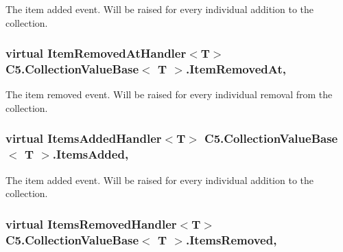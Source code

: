 The item added event. Will be raised for every individual addition to the collection. 

\hypertarget{class_c5_1_1_collection_value_base_a9cd4d9d9e588e1a8fe51390906b3c66a}{}
\subsubsection[{Item\+Removed\+At}]{\setlength{\rightskip}{0pt plus 5cm}virtual Item\+Removed\+At\+Handler$<$T$>$ {\bf C5.\+Collection\+Value\+Base}$<$ T $>$.Item\+Removed\+At\hspace{0.3cm}{\ttfamily [add]}, {\ttfamily [remove]}}\label{class_c5_1_1_collection_value_base_a9cd4d9d9e588e1a8fe51390906b3c66a}


The item removed event. Will be raised for every individual removal from the collection. 

\hypertarget{class_c5_1_1_collection_value_base_a3d7c78ee19bebf048061156c67aca5ef}{}
\subsubsection[{Items\+Added}]{\setlength{\rightskip}{0pt plus 5cm}virtual Items\+Added\+Handler$<$T$>$ {\bf C5.\+Collection\+Value\+Base}$<$ T $>$.Items\+Added\hspace{0.3cm}{\ttfamily [add]}, {\ttfamily [remove]}}\label{class_c5_1_1_collection_value_base_a3d7c78ee19bebf048061156c67aca5ef}


The item added event. Will be raised for every individual addition to the collection. 

\hypertarget{class_c5_1_1_collection_value_base_a85608b4643299c9d576f68cf7cea70eb}{}
\subsubsection[{Items\+Removed}]{\setlength{\rightskip}{0pt plus 5cm}virtual Items\+Removed\+Handler$<$T$>$ {\bf C5.\+Collection\+Value\+Base}$<$ T $>$.Items\+Removed\hspace{0.3cm}{\ttfamily [add]}, {\ttfamily [remove]}}\label{class_c5_1_1_collection_value_base_a85608b4643299c9d576f68cf7cea70eb}


